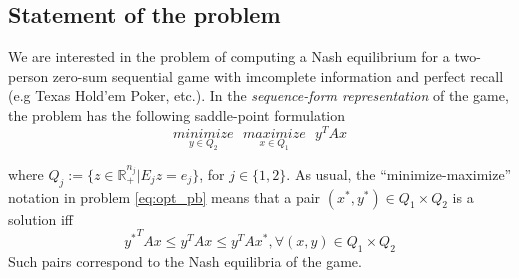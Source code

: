 \documentclass[a4paper,9pt,journal]{IEEEtran}
\begin{document}

\subsection{Statement of the problem}
We are interested in the problem of computing a Nash equilibrium for a two-person zero-sum sequential game with imcomplete information
and perfect recall (e.g Texas Hold'em Poker, etc.). In the \textit{sequence-form representation} of the game, the problem has the following saddle-point formulation
\begin{equation}
  \underset{y \in Q_2}{minimize}\text{ }\underset{x \in Q_1}{maximize}\text{ }{y^TAx}
  \label{eq:opt_pb}
\end{equation}

where $Q_j := \{z \in \mathbb{R}_+^{n_j}|E_jz=e_j\}$, for $j \in \{1, 2\}$. As usual, the ``minimize-maximize'' notation in problem
\eqref{eq:opt_pb} means that a pair $(x^*, y^*) \in Q_1 \times Q_2$ is a solution iff
\begin{equation}
  {y^*}^TAx \le y^TAx \le y^TAx^*, \forall (x, y) \in Q_1 \times Q_2
\end{equation}
Such pairs correspond to the Nash equilibria of the game.
\end{document}
